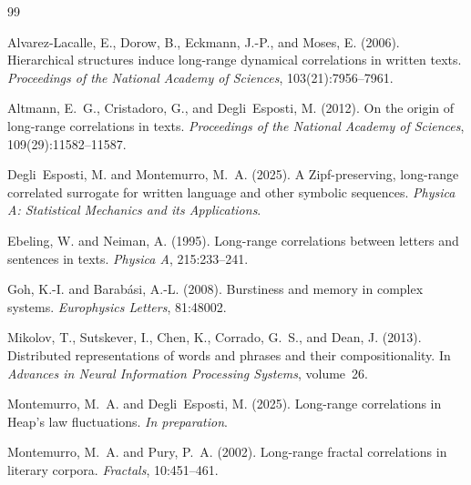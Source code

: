 \documentclass[preprint]{elsarticle}
\begin{document}
%

\begin{thebibliography}{99}

Alvarez-Lacalle, E., Dorow, B., Eckmann, J.-P., and Moses, E. (2006).
\newblock Hierarchical structures induce long-range dynamical correlations in written texts.
\newblock \emph{Proceedings of the National Academy of Sciences},
  103(21):7956--7961.

Altmann, E.~G., Cristadoro, G., and Degli~Esposti, M. (2012).
\newblock On the origin of long-range correlations in texts.
\newblock \emph{Proceedings of the National Academy of Sciences},
  109(29):11582--11587.

Degli~Esposti, M. and Montemurro, M.~A. (2025).
\newblock A {Z}ipf-preserving, long-range correlated surrogate for
  written language and other symbolic sequences.
\newblock \emph{Physica A: Statistical Mechanics and its Applications}.

Ebeling, W. and Neiman, A. (1995).
\newblock Long-range correlations between letters and sentences in
  texts.
\newblock \emph{Physica A}, 215:233--241.

Goh, K.-I. and Barab{\'a}si, A.-L. (2008).
\newblock Burstiness and memory in complex systems.
\newblock \emph{Europhysics Letters}, 81:48002.

Mikolov, T., Sutskever, I., Chen, K., Corrado, G.~S., and Dean, J.
  (2013).
\newblock Distributed representations of words and phrases and their
  compositionality.
\newblock In \emph{Advances in Neural Information Processing Systems},
  volume~26.

Montemurro, M.~A. and Degli~Esposti, M. (2025).
\newblock Long-range correlations in {H}eap's law fluctuations.
\newblock \emph{In preparation}.

Montemurro, M.~A. and Pury, P.~A. (2002).
\newblock Long-range fractal correlations in literary corpora.
\newblock \emph{Fractals}, 10:451--461.


\end{thebibliography}
\end{document}
